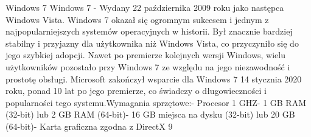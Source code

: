 \begin{frame}{Windows 7}
Windows 7 -  Wydany 22 października 2009 roku jako następca Windows Vista.
Windows 7 okazał się ogromnym sukcesem i jednym z najpopularniejszych systemów operacyjnych w historii. Był znacznie bardziej stabilny i przyjazny dla użytkownika niż Windows Vista, co przyczyniło się do jego szybkiej adopcji. Nawet po premierze kolejnych wersji Windows, wielu użytkowników pozostało przy Windows 7 ze względu na jego niezawodność i prostotę obsługi. Microsoft zakończył wsparcie dla Windows 7 14 stycznia 2020 roku, ponad 10 lat po jego premierze, co świadczy o długowieczności i popularności tego systemu.Wymagania sprzętowe:- Procesor 1 GHZ- 1 GB RAM (32-bit) lub 2 GB RAM (64-bit)- 16 GB miejsca na dysku (32-bit) lub 20 GB (64-bit)- Karta graficzna zgodna z DirectX 9

\end{frame}
